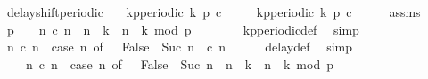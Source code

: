 \begin{isabellebody}
\isamarkupfalse%
\ delay{\isacharunderscore}shift{\isacharunderscore}periodic{\isacharcolon}\isanewline
\ \ \ {\isacartoucheopen}kp{\isacharunderscore}periodic\ k\ p\ c{\isacartoucheclose}\isanewline
\ \ \ \ \ {\isacartoucheopen}kp{\isacharunderscore}periodic\ {\isacharparenleft}k{\isacharplus}{}{\isacharparenright}\ p\ {\isacharparenleft}{\isachardollar}c{\isacharparenright}{\isacartoucheclose}\isanewline
%
\isadelimproof
%
\endisadelimproof
%
\isatagproof
{}\isamarkupfalse%
\ {\isacharminus}\isanewline
\ \ \isamarkupfalse%
\ assms\ \isamarkupfalse%
\ {}{\isacharcolon}{\isacartoucheopen}{\isacharparenleft}p\ {\isachargreater}\ {}{\isacharparenright}{\isacartoucheclose}\ \ {}{\isacharcolon}{\isacartoucheopen}{\isacharparenleft}{\isasymforall}n{\isachardot}\ c\ n\ {\isacharequal}\ {\isacharparenleft}{\isacharparenleft}n\ {\isasymge}\ k{\isacharparenright}\ {\isasymand}\ {\isacharparenleft}{\isacharparenleft}n\ {\isacharminus}\ k{\isacharparenright}\ mod\ p\ {\isacharequal}\ {}{\isacharparenright}{\isacharparenright}{\isacharparenright}{\isacartoucheclose}\isanewline
\ \ \ \ \isamarkupfalse%
\ kp{\isacharunderscore}periodic{\isacharunderscore}def\ \isamarkupfalse%
\ simp{\isacharplus}\isanewline
\ \ \isamarkupfalse%
\ {\isacartoucheopen}{\isasymforall}n{\isachardot}\ {\isacharparenleft}{\isachardollar}c{\isacharparenright}\ n\ {\isacharequal}\ {\isacharparenleft}case\ n\ of\ {}\ {\isasymRightarrow}\ False\ {\isacharbar}\ Suc\ n{\isacharprime}\ {\isasymRightarrow}\ c\ n{\isacharprime}{\isacharparenright}{\isacartoucheclose}\isanewline
\ \ \ \ \isamarkupfalse%
\ delay{\isacharunderscore}def\ \isamarkupfalse%
\ simp\isanewline
\ \ \isamarkupfalse%
\ {}\ \isamarkupfalse%
\isanewline
\ \ \ \ {}{\isacharcolon}{\isacartoucheopen}{\isasymforall}n{\isachardot}\ {\isacharparenleft}{\isachardollar}c{\isacharparenright}\ n\ {\isacharequal}\ {\isacharparenleft}case\ n\ of\ {}\ {\isasymRightarrow}\ False\ {\isacharbar}\ Suc\ n{\isacharprime}\ {\isasymRightarrow}\ {\isacharparenleft}{\isacharparenleft}n{\isacharprime}\ {\isasymge}\ k{\isacharparenright}\ {\isasymand}\ {\isacharparenleft}{\isacharparenleft}n{\isacharprime}\ {\isacharminus}\ k{\isacharparenright}\ mod\ p\ {\isacharequal}\ {}{\isacharparenright}{\isacharparenright}{\isacharparenright}{\isacartoucheclose}\isanewline

\end{isabellebody}
